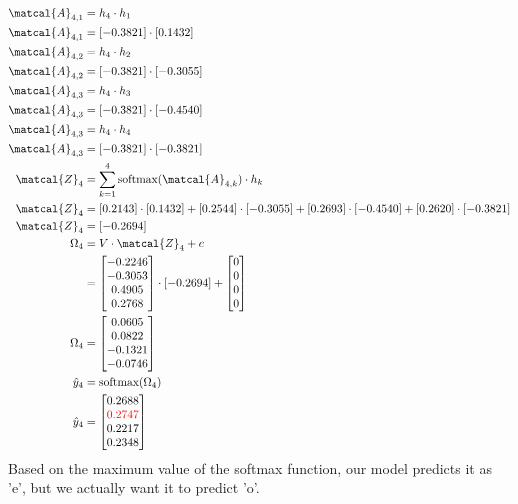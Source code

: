 \documentclass{article}
\begin{document}
\begin{align*}
\matcal{A}_{4,1} &= h_4 \cdot h_1 \\
\matcal{A}_{4,1} &= [-0.3821] \cdot [0.1432] \\
\matcal{A}_{4,2} &= h_4 \cdot h_2 \\
\matcal{A}_{4,2} &= [-0.3821] \cdot [-0.3055] \\
\matcal{A}_{4,3} &= h_4 \cdot h_3 \\
\matcal{A}_{4,3} &= [-0.3821] \cdot [-0.4540] \\
\matcal{A}_{4,3} &= h_4 \cdot h_4 \\
\matcal{A}_{4,3} &= [-0.3821] \cdot [-0.3821] \\
\matcal{Z}_4 &= \sum_{k=1}^4 \text{softmax}(\matcal{A}_{4,k}) \cdot h_k \\
\matcal{Z}_4 &= [0.2143] \cdot [0.1432] + [0.2544] \cdot [-0.3055]+ [0.2693] \cdot [-0.4540]+ [0.2620] \cdot [-0.3821]\\
\matcal{Z}_4 &= [-0.2694] \\
\Omega_4 &= V \cdot \matcal{Z}_4 + c \\
 &= \begin{bmatrix} -0.2246 \\ -0.3053 \\ 0.4905 \\ 0.2768 \end{bmatrix} \cdot [-0.2694] + \begin{bmatrix} 0 \\ 0 \\ 0 \\ 0\end{bmatrix}\\
\Omega_4 &= \begin{bmatrix} 0.0605 \\ 0.0822 \\ -0.1321 \\ -0.0746 \end{bmatrix} \\
\hat{y}_4 &= \text{softmax}(\Omega_4) \\
\hat{y}_4 &= \begin{bmatrix} 0.2688 \\ \textcolor{red}{0.2747} \\ 0.2217 \\ 0.2348 \end{bmatrix} \\
\end{align*}
Based on the maximum value of the softmax function, our model predicts it as 'e', but we actually want it to predict 'o'.
\end{document}
